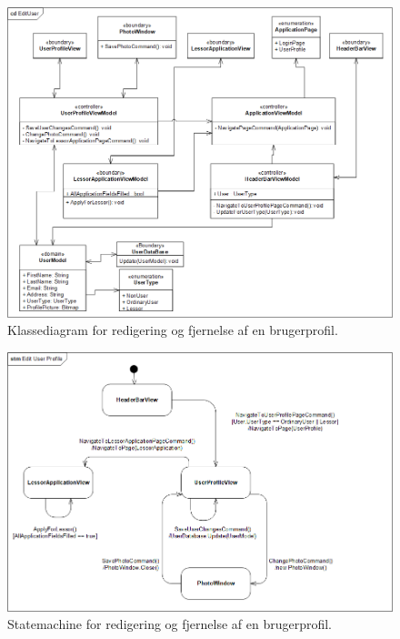 \documentclass[Arkitektur/System_main.tex]{subfiles}
\begin{document}
\begin{figure}[H]
    \centering
    \includegraphics[width=1\textwidth]{Arkitektur/Softwarearkitektur/Edit_user_profile/graphics/EditUserCD.png}
    \caption{Klassediagram for redigering og fjernelse af en brugerprofil. }
    \label{fig:EditUserCD}
\end{figure}

\begin{figure}[H]
    \centering
    \includegraphics[width=1\textwidth]{Arkitektur/Softwarearkitektur/Edit_user_profile/graphics/EditUserSTM.png}
    \caption{Statemachine for redigering og fjernelse af en brugerprofil. }
    \label{fig:EditUserSTM}
\end{figure}
\end{document}
